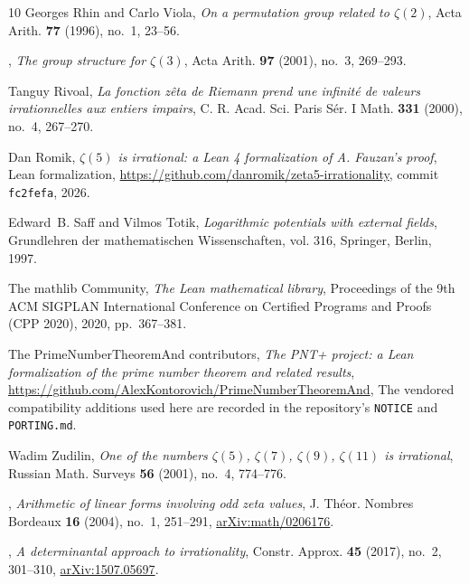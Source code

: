 \documentclass[11pt]{amsart}
\theoremstyle{definition}
\theoremstyle{remark}
\numberwithin{equation}{section}
\begin{document}
\begin{thebibliography}{10}
Georges Rhin and Carlo Viola, \emph{On a permutation group related to
  {$\zeta(2)$}}, Acta Arith. \textbf{77} (1996), no.~1, 23--56.

\bysame, \emph{The group structure for {$\zeta(3)$}}, Acta Arith. \textbf{97}
  (2001), no.~3, 269--293.

Tanguy Rivoal, \emph{La fonction z\^eta de {R}iemann prend une infinit\'e de
  valeurs irrationnelles aux entiers impairs}, C. R. Acad. Sci. Paris S\'er. I
  Math. \textbf{331} (2000), no.~4, 267--270.

Dan Romik, \emph{{$\zeta(5)$} is irrational: a {L}ean 4 formalization of {A}.
  {F}auzan's proof}, Lean formalization,
  \url{https://github.com/danromik/zeta5-irrationality}, commit
  \texttt{fc2fefa}, 2026.

Edward~B. Saff and Vilmos Totik, \emph{Logarithmic potentials with external
  fields}, Grundlehren der mathematischen Wissenschaften, vol. 316, Springer,
  Berlin, 1997.

{The mathlib Community}, \emph{The {L}ean mathematical library}, Proceedings of
  the 9th ACM SIGPLAN International Conference on Certified Programs and Proofs
  (CPP 2020), 2020, pp.~367--381.

{The PrimeNumberTheoremAnd contributors}, \emph{The {PNT+} project: a {L}ean
  formalization of the prime number theorem and related results},
  \url{https://github.com/AlexKontorovich/PrimeNumberTheoremAnd}, The vendored
  compatibility additions used here are recorded in the repository's
  \texttt{NOTICE} and \texttt{PORTING.md}.

Wadim Zudilin, \emph{One of the numbers {$\zeta(5)$}, {$\zeta(7)$},
  {$\zeta(9)$}, {$\zeta(11)$} is irrational}, Russian Math. Surveys \textbf{56}
  (2001), no.~4, 774--776.

\bysame, \emph{Arithmetic of linear forms involving odd zeta values}, J.
  Th\'eor. Nombres Bordeaux \textbf{16} (2004), no.~1, 251--291,
  \href{https://arxiv.org/abs/math/0206176}{arXiv:math/0206176}.

\bysame, \emph{A determinantal approach to irrationality}, Constr. Approx.
  \textbf{45} (2017), no.~2, 301--310,
  \href{https://arxiv.org/abs/1507.05697}{arXiv:1507.05697}.

\end{thebibliography}
\end{document}
